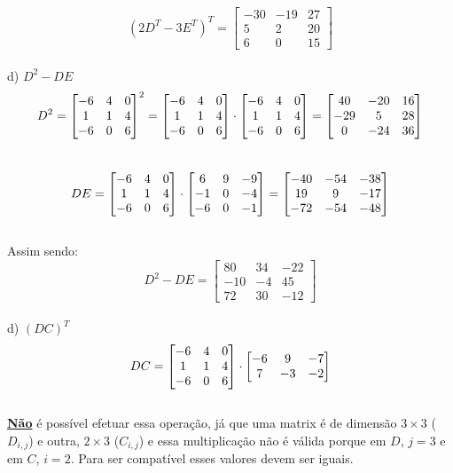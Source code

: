 \begin{equation}
    (2D^T-3E^T)^T =
    \begin{bmatrix}
        -30 & -19 & 27 \\
        5   & 2   & 20 \\
        6   & 0   & 15
    \end{bmatrix}
\end{equation}
\\

d) $D^2-DE$
\\

\[
    D^2 =
    \begin{bmatrix} -6 & 4 & 0 \\ 1 & 1 & 4 \\ -6 & 0 & 6 \end{bmatrix}^2 =
    \begin{bmatrix} -6 & 4 & 0 \\ 1 & 1 & 4 \\ -6 & 0 & 6 \end{bmatrix} \cdot
    \begin{bmatrix} -6 & 4 & 0 \\ 1 & 1 & 4 \\ -6 & 0 & 6 \end{bmatrix} =
    \begin{bmatrix}
        40  & -20 & 16 \\
        -29 & 5   & 28 \\
        0   & -24 & 36
    \end{bmatrix}
\]
\\

\[
    DE =
    \begin{bmatrix} -6 & 4 & 0 \\ 1 & 1 & 4 \\ -6 & 0 & 6 \end{bmatrix}\cdot
    \begin{bmatrix} 6 & 9 & -9 \\ -1 & 0 & -4 \\ -6 & 0 & -1 \end{bmatrix}
    =
    \begin{bmatrix}
        -40 & -54 & -38 \\
        19  & 9   & -17 \\
        -72 & -54 & -48
    \end{bmatrix}
\]
\\

Assim sendo:
\\

\begin{equation}
    D^2-DE =
    \begin{bmatrix}
        80  & 34 & -22 \\
        -10 & -4 & 45  \\
        72  & 30 & -12
    \end{bmatrix}
\end{equation}
\\

d) $(DC)^T$
\\

\[
    DC =
    \begin{bmatrix} -6 & 4 & 0 \\ 1 & 1 & 4 \\ -6 & 0 & 6 \end{bmatrix} \cdot
    \begin{bmatrix} -6 & 9 & -7 \\ 7 & -3 & -2 \end{bmatrix}
\]
\\


\textcolor{COLOR2}{\textbf{\underline{Não}} é possível efetuar essa operação, já que uma matrix é de dimensão $3\times3$ ($D_{i,j}$) e outra, $2\times3$ ($C_{i, j}$) e essa multiplicação não é válida porque em $D$, $j=3$ e em $C$, $i=2$. Para ser compatível esses valores devem ser iguais.}
\\